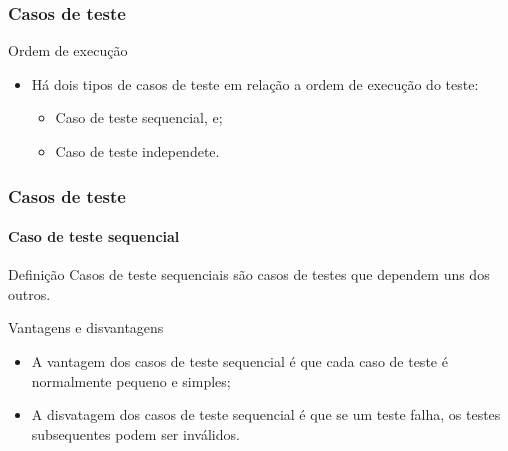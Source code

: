 \begin{frame}
\frametitle{Casos de teste}

\begin{block:fact}{Ordem de execução}
\begin{itemize}
    \item Há dois tipos de casos de teste em relação a ordem de execução do teste:
	\begin{itemize}
		\item Caso de teste sequencial, e;
		\item Caso de teste independete.
	\end{itemize}
\end{itemize}
\end{block:fact}
\end{frame}


\begin{frame}
\label{concept:cascading-test-case}
\frametitle{Casos de teste}
\framesubtitle{Caso de teste sequencial}

\begin{block:concept}{Definição}
Casos de teste sequenciais são casos de testes que dependem uns dos outros.
\end{block:concept}


\begin{block:fact}{Vantagens e disvantagens}
\begin{itemize}
	\item A vantagem dos casos de teste sequencial é que cada caso de teste é normalmente pequeno e simples;

	\item A disvatagem dos casos de teste sequencial é que se um teste falha, os testes subsequentes podem ser inválidos.
\end{itemize}
\end{block:fact}

\hfill
{}
\end{frame}



